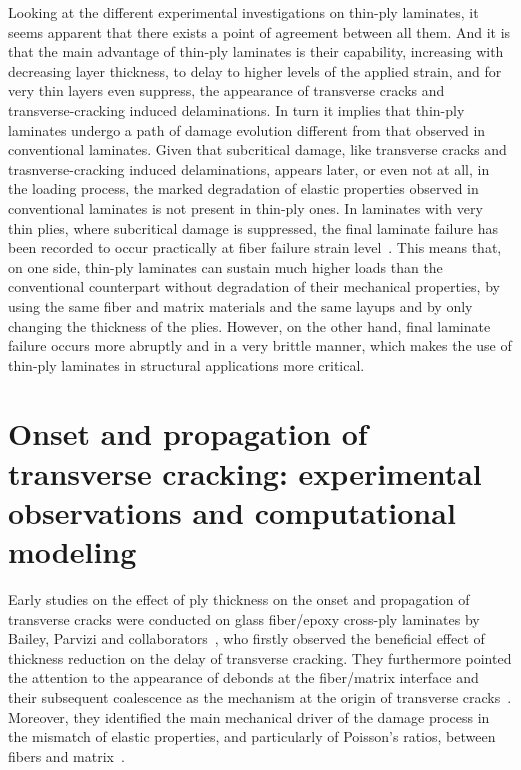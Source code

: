 Looking at the different experimental investigations on thin-ply laminates, it seems apparent that there exists a point of agreement between all them. And it is that the main advantage of thin-ply laminates is their capability, increasing with decreasing layer thickness, to delay to higher levels of the applied strain, and for very thin layers even suppress, the appearance of transverse cracks and transverse-cracking induced delaminations. In turn it implies that thin-ply laminates undergo a path of damage evolution different from that observed in conventional laminates. Given that subcritical damage, like transverse cracks and trasnverse-cracking induced delaminations, appears later, or even not at all, in the loading process, the marked degradation of elastic properties observed in conventional laminates is not present in thin-ply ones. In laminates with very thin plies, where subcritical damage is suppressed, the final laminate failure has been recorded to occur practically at fiber failure strain level~\cite{Cugnoni2018}. This means that, on one side, thin-ply laminates can sustain much higher loads than the conventional counterpart without degradation of their mechanical properties, by using the same fiber and matrix materials and the same layups and by only changing the thickness of the plies. However, on the other hand, final laminate failure occurs more abruptly and in a very brittle manner, which makes the use of thin-ply laminates in structural applications more critical. 

\section{Onset and propagation of transverse cracking: experimental observations and computational modeling}

Early studies on the effect of ply thickness on the onset and propagation of transverse cracks were conducted on glass fiber/epoxy cross-ply laminates by Bailey, Parvizi and collaborators~\cite{Garrett1977,Parvizi1978a,Parvizi1978b}, who firstly observed the beneficial effect of thickness reduction on the delay of transverse cracking. They furthermore pointed the attention to the appearance of debonds at the fiber/matrix interface and their subsequent coalescence as the mechanism at the origin of transverse cracks~\cite{Bailey1981}. Moreover, they identified the main mechanical driver of the damage process in the mismatch of elastic properties, and particularly of Poisson's ratios, between fibers and matrix~\cite{Bailey1979}.


